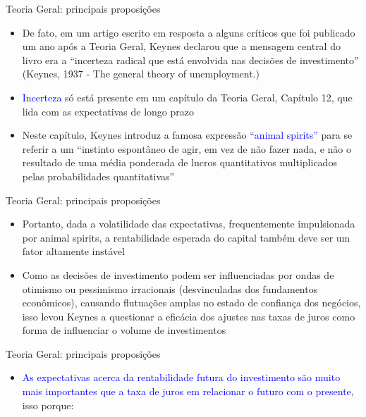 \documentclass[10pt]{beamer}
\begin{document}
\begin{frame}{Teoria Geral: principais proposições}
    \begin{itemize}
        \item De fato, em um artigo escrito em resposta a alguns críticos que foi publicado um ano após a Teoria Geral, Keynes declarou que a mensagem central do livro era a ``incerteza radical que está envolvida nas decisões de investimento'' (Keynes, 1937 - The general theory of unemployment.)
        \bigskip
        \item \textcolor{blue}{Incerteza} só está presente em um capítulo da Teoria Geral, Capítulo 12, que lida com as expectativas de longo prazo
        \bigskip
        \item Neste capítulo, Keynes introduz a famosa expressão \textcolor{blue}{``animal spirits''} para se referir a um ``instinto espontâneo de agir, em vez de não fazer nada, e não o resultado de uma média ponderada de lucros quantitativos multiplicados pelas probabilidades quantitativas''
    \end{itemize}
\end{frame}

\begin{frame}{Teoria Geral: principais proposições}
    \begin{itemize}
        \item Portanto, dada a volatilidade das expectativas, frequentemente impulsionada por animal spirits, a rentabilidade esperada do capital também deve ser um fator altamente instável
        \bigskip
        \item Como as decisões de investimento podem ser influenciadas por ondas de otimismo ou pessimismo irracionais (desvinculadas dos fundamentos econômicos), causando flutuações amplas no estado de confiança dos negócios, isso levou Keynes a questionar a eficácia dos ajustes nas taxas de juros como forma de influenciar o volume de investimentos
    \end{itemize}
\end{frame}

\begin{frame}{Teoria Geral: principais proposições}
    \begin{itemize}
        \item \textcolor{blue}{As expectativas acerca da rentabilidade futura do investimento são muito mais importantes que a taxa de juros em relacionar o futuro com o presente}, isso porque:\bigskip
    \end{itemize}
\end{frame}
\end{document}
